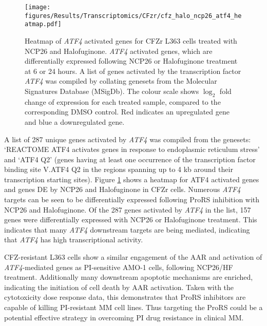 \begin{figure}[p]
\centering
\texttt{[image: figures/Results/Transcriptomics/CFzr/cfz\_halo\_ncp26\_atf4\_heatmap.pdf]}
\caption[Heatmap of \textit{ATF4} activated genes for ProRS treated CFZr cells]{Heatmap of \textit{ATF4} activated genes for CFZr L363 cells treated with NCP26 and Halofuginone.
\textit{ATF4} activated genes, which are differentially expressed following NCP26 or Halofuginone treatment at 6 or 24 hours.
A list of genes activated by the transcription factor \textit{ATF4} was compiled by collating genesets from the Molecular Signatures Database (MSigDb).
The colour scale shows $\log_{2}$ fold change of expression for each treated sample, compared to the corresponding DMSO control.
Red indicates an upregulated gene and blue a downregulated gene.
}
\label{fig:cfz_atf4_heatmap}
\end{figure}

A list of 287 unique genes activated by \textit{ATF4} was compiled from the genesets: `REACTOME ATF4 activates genes in response to endoplasmic reticulum stress' and `ATF4 Q2' (genes having at least one occurrence of the transcription factor binding site V.ATF4 Q2 in the regions spanning up to 4 kb around their transcription starting sites).
Figure \ref{fig:cfz_atf4_heatmap} shows a heatmap for ATF4 activated genes and genes DE by NCP26 and Halofuginone in CFZr cells.
Numerous \textit{ATF4} targets can be seen to be differentially expressed following ProRS inhibition with NCP26 and Halofuginone.
Of the 287 genes activated by \textit{ATF4} in the list, 157 genes were differentially expressed with NCP26 or Halofuginone treatment.
This indicates that many \textit{ATF4} downstream targets are being mediated, indicating that \textit{ATF4} has high transcriptional activity.

CFZ-resistant L363 cells show a similar engagement of the AAR and activation of \textit{ATF4}-mediated genes as PI-sensitive AMO-1 cells, following NCP26/HF treatment.
Additionally many downstream apoptotic mechanisms are enriched, indicating the initiation of cell death by AAR activation.
Taken with the cytotoxicity dose response data, this demonstrates that ProRS inhibitors are capable of killing PI-resistant MM cell lines.
Thus targeting the ProRS could be a potential effective strategy in overcoming PI drug resistance in clinical MM\@.

\clearpage
